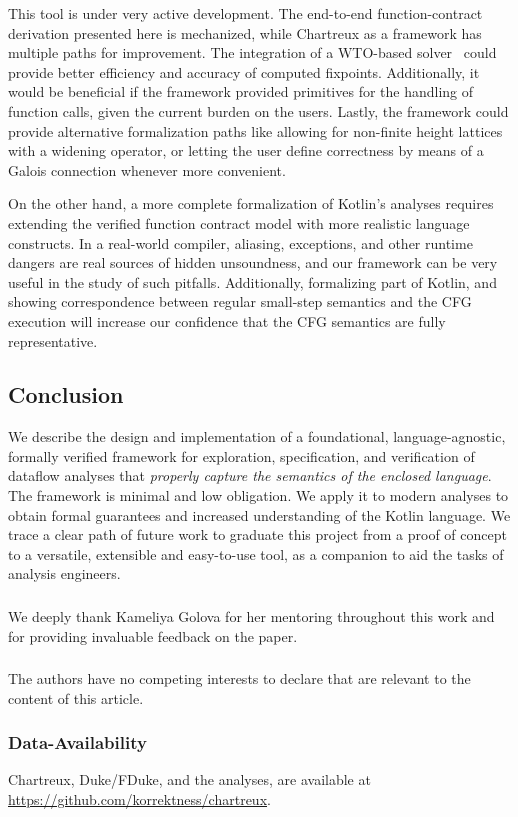 \documentclass[runningheads]{llncs}
\newcommand{\Chartreux}{\textsf{Chartreux}}
\begin{document}
This tool is under very active development. The end-to-end function-contract derivation presented here is mechanized, while \Chartreux{} as a framework has multiple paths for improvement. The integration of a WTO-based solver~\cite{LaSpina25} could provide better efficiency and accuracy of computed fixpoints. Additionally, it would be beneficial if the framework provided primitives for the handling of function calls, given the current burden on the users. Lastly, the framework could provide alternative formalization paths like allowing for non-finite height lattices with a widening operator, or letting the user define correctness by means of a Galois connection whenever more convenient.

On the other hand, a more complete formalization of Kotlin's analyses requires extending the verified function contract model with more realistic language constructs. In a real-world compiler, aliasing, exceptions, and other runtime dangers are real sources of hidden unsoundness, and our framework can be very useful in the study of such pitfalls. Additionally, formalizing part of Kotlin, and showing correspondence between regular small-step semantics and the CFG execution will increase our confidence that the CFG semantics are fully representative.

\subsection{Conclusion}
\label{sec:conc}

We describe the design and implementation of a foundational, language-agnostic, formally verified framework for exploration, specification, and verification of dataflow analyses that \emph{properly capture the semantics of the enclosed language}. The framework is minimal and low obligation. We apply it to modern analyses to obtain formal guarantees and increased understanding of the Kotlin language. We trace a clear path of future work to graduate this project from a proof of concept to a versatile, extensible and easy-to-use tool, as a companion to aid the tasks of analysis engineers.

\begin{credits}
\subsubsection{\ackname} We deeply thank Kameliya Golova for her mentoring throughout this work and for providing invaluable feedback on the paper.

\subsubsection{\discintname}
The authors have no competing interests to declare that are relevant to the content of this article.

\subsubsection{Data-Availability}
Chartreux, Duke/FDuke, and the analyses, are available at \url{https://github.com/korrektness/chartreux}.
\end{credits}
\end{document}
